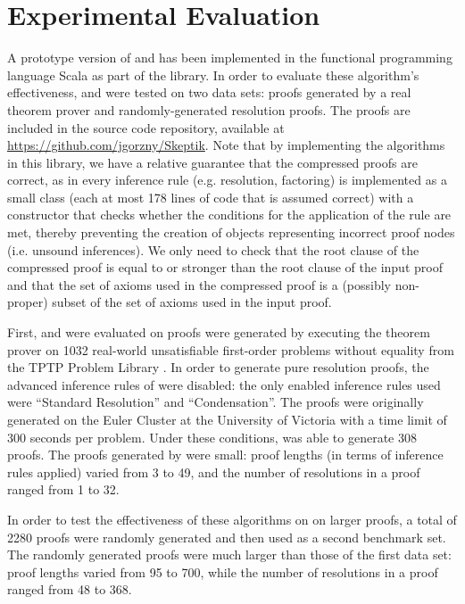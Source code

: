 \section{Experimental Evaluation} \label{sec:exp}

A prototype version of  {\GFOLU} and {\FORPI} has been implemented in the functional programming language Scala as part of the \skeptik library. 
In order to evaluate these algorithm's effectiveness,  {\GFOLU} and {\FORPI} were tested on two data sets: proofs generated by a real theorem prover and randomly-generated resolution proofs. 
The proofs are included in the source code repository, available at \url{https://github.com/jgorzny/Skeptik}. 
Note that by implementing the algorithms in this library, we have a relative guarantee that the compressed proofs are correct, as in \skeptik every inference rule (e.g. resolution, factoring) is implemented as a small class (each at most 178 lines of code that is assumed correct) with a constructor that checks whether the conditions for the application of the rule are met, thereby preventing the creation of objects representing incorrect proof nodes (i.e. unsound inferences). 
We only need to check that the root clause of the compressed proof is equal to or stronger than the root clause of the input proof and that the set of axioms used in the compressed proof is a (possibly non-proper) subset of the set of axioms used in the input proof.

First, {\GFOLU} and {\FORPI} were evaluated on proofs were generated by executing the {\SPASS} theorem prover \cite{Spass} on 1032 real-world unsatisfiable first-order problems without equality from the TPTP Problem Library \cite{TPTP}. 
In order to generate pure resolution proofs, the advanced inference rules of {\SPASS} were disabled: the only enabled inference rules used were ``Standard Resolution'' and ``Condensation''. 
The proofs were originally generated on the Euler Cluster at the University of Victoria with a time limit of 300 seconds per problem. 
Under these conditions, {\SPASS} was able to generate 308 proofs. 
The proofs generated by {\SPASS} were small: proof lengths (in terms of inference rules applied) varied from 3 to 49, and the number of resolutions in a proof ranged from 1 to 32.

In order to test the effectiveness of these algorithms on on larger proofs, a total of 2280 proofs were randomly generated and then used as a second benchmark set. 
The randomly generated proofs were much larger than those of the first data set: proof lengths varied from 95 to 700, while the number of resolutions in a proof ranged from 48 to 368.

